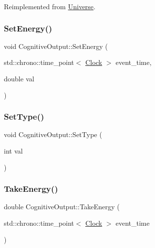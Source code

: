 Reimplemented from \mbox{\hyperlink{classUniverse_aa22202ae740eb1355529afcb13285e91}{Universe}}.

\mbox{\label{classCognitiveOutput_acc16ca3521689776ecd68255ece1e671}} 
\subsubsection{\texorpdfstring{Set\+Energy()}{SetEnergy()}}
{\footnotesize\ttfamily void Cognitive\+Output\+::\+Set\+Energy (\begin{DoxyParamCaption}\item[{std\+::chrono\+::time\+\_\+point$<$ \mbox{\hyperlink{universe_8h_a0ef8d951d1ca5ab3cfaf7ab4c7a6fd80}{Clock}} $>$}]{event\+\_\+time,  }\item[{double}]{val }\end{DoxyParamCaption})\hspace{0.3cm}{\ttfamily [inline]}}

\mbox{\label{classCognitiveOutput_ac76f41ab3b65ea466e9e2999270f2e5a}} 
\subsubsection{\texorpdfstring{Set\+Type()}{SetType()}}
{\footnotesize\ttfamily void Cognitive\+Output\+::\+Set\+Type (\begin{DoxyParamCaption}\item[{int}]{val }\end{DoxyParamCaption})\hspace{0.3cm}{\ttfamily [inline]}}

\mbox{\label{classCognitiveOutput_aae27d114676c68e02ae6e7ae36326ba8}} 
\subsubsection{\texorpdfstring{Take\+Energy()}{TakeEnergy()}}
{\footnotesize\ttfamily double Cognitive\+Output\+::\+Take\+Energy (\begin{DoxyParamCaption}\item[{std\+::chrono\+::time\+\_\+point$<$ \mbox{\hyperlink{universe_8h_a0ef8d951d1ca5ab3cfaf7ab4c7a6fd80}{Clock}} $>$}]{event\+\_\+time }\end{DoxyParamCaption})\hspace{0.3cm}{\ttfamily [inline]}}

